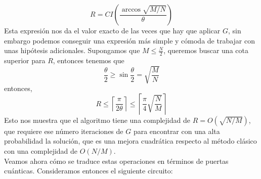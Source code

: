 \documentclass[a4paper]{article}
\numberwithin{equation}{section}
\begin{document}
\begin{equation}
R = CI\left( \frac{\arccos \sqrt{M/N}}{\theta} \right)
\end{equation}
Esta expresión nos da el valor exacto de las veces que hay que aplicar $G$, sin embargo podemos conseguir una expresión más simple y cómoda de trabajar con unas hipótesis adicionales. Supongamos que $M \leq \frac{N}{2}$, queremos buscar una cota superior para $R$, entonces tenemos que
\begin{equation}
\frac{\theta}{2} \geq \sin \frac{\theta}{2} = \sqrt{\frac{M}{N}}
\end{equation}
entonces,
\begin{equation}
R \leq \left\lceil \frac{\pi}{2\theta} \right\rceil \leq \left\lceil \frac{\pi}{4} \sqrt{\frac{N}{M}} \right\rceil
\end{equation}
Esto nos muestra que el algoritmo tiene una complejidad de $R = O(\sqrt{N/M})$, que requiere ese número iteraciones de $G$ para encontrar con una alta probabilidad la solución, que es una mejora cuadrática respecto al método clásico con una complejidad de $O(N/M)$.\\

Veamos ahora cómo se traduce estas operaciones en términos de puertas cuánticas. Consideramos entonces el siguiente circuito:
\end{document}
